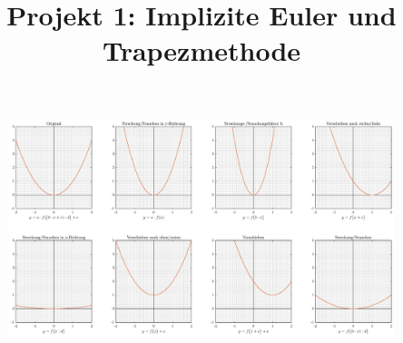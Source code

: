 \documentclass[
	final,
	a4paper,
	oneside,
	parskip=full,
	headings=standardclasses,
	headings=big,
	pointednumbers
]{scrartcl}
\title{Projekt 1: Implizite Euler und Trapezmethode}
\begin{document}
	\begin{figure}[htbp]
		\hspace{-50pt}
		\includegraphics[width=1.6\textwidth]{fig.eps}
	\end{figure}
		
\end{document}
